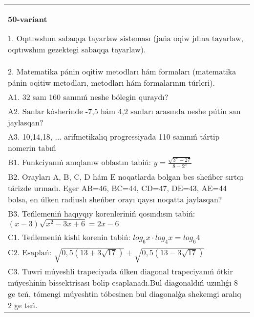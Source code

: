 \documentclass{article}
\begin{document}
\begin{tabular}{m{17cm}}
\textbf{50-variant}

1. Oqıtıwshını sabaqqa tayarlaw sisteması (jańa oqiw jılına tayarlaw, oqıtıwshını gezektegi sabaqqa tayarlaw). \\
2. Matematika pánin oqitiw metodları hám formaları (matematika pánin oqitiw metodları, metodları hám formalarının túrleri). \\
A1. 32 sanı 160 sanınıń neshe bólegin quraydı? \\
A2. Sanlar kósherinde -7,5 hám 4,2 sanları arasında neshe pútin san jaylasqan? \\
A3. 10,14,18, ... arifmetikalıq progressiyada 110 sanınıń tártip nomerin tabıń \\
B1. Funkciyanıń anıqlanıw oblastın tabiń: \(y = \frac{\sqrt{3^{x} - 27}}{8 - 2^{x}}\) \\
B2. Orayları A, B, C, D hám E noqatlarda bolgan bes sheńber sırtqı tárizde urınadı. Eger AB=46, BC=44, CD=47, DE=43, AE=44 bolsa, en úlken radiuslı sheńber orayı qaysı noqatta jaylasqan? \\
B3. Teńlemeniń haqıyqıy korenleriniń qosındısın tabiń: \((x-3) \sqrt{x^{2} - 3x + 6} = 2x - 6\) \\
C1. Teńlemeniń kishi korenin tabiń: \(log_{6}x \cdot log_{4}x = log_{6}4\) \\
C2. Esaplań: \(\sqrt{0,5 (13 + 3\sqrt{17}) } + \sqrt{0,5 (13 - 3\sqrt{17}) }\) \\
C3. Tuwri múyeshli trapeciyada úlken diagonal trapeciyanıń ótkir múyeshinin bissektrisası bolip esaplanadı.Bul diagonaldıń uzınlıǵı 8 ge teń, tómengi múyeshtin tóbesinen bul diagonalģa shekemgi aralıq 2 ge teń. \\

\end{tabular}
\vspace{1cm}
\end{document}
